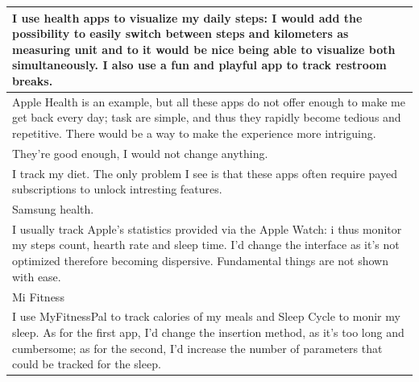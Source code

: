 \documentclass{article}
\begin{document}
\begin{table}[H]
\begin{tabularx}{0.9\textwidth}{X}
        \hline
        I use health apps to visualize my daily steps: I would add the possibility to easily switch between steps and kilometers as measuring unit and to it would be nice being able to visualize both simultaneously. I also use a fun and playful app to track restroom breaks. \\
        \hline
        Apple Health is an example, but all these apps do not offer enough to make me get back every day; task are simple, and thus they rapidly become tedious and repetitive. There would be a way to make the experience more intriguing. \\
        \hline
        They're good enough, I would not change anything. \\
        \hline
        I track my diet. The only problem I see is that these apps often require payed subscriptions to unlock intresting features. \\
        \hline
        Samsung health. \\
        \hline
        I usually track Apple's statistics provided via the Apple Watch: i thus monitor my steps count, hearth rate and sleep time. I'd change the interface as it's not optimized therefore becoming dispersive. Fundamental things are not shown with ease. \\
        \hline
        Mi Fitness \\
        \hline
        I use MyFitnessPal to track calories of my meals and Sleep Cycle to monir my sleep. As for the first app, I'd change the insertion method, as it's too long and cumbersome; as for the second, I'd increase the number of parameters that could be tracked for the sleep. \\
        \hline
    \end{tabularx}
\end{table}
\end{document}
